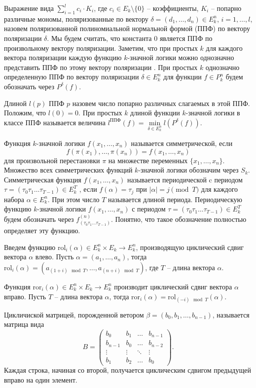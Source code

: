 \documentclass[bibliography=totoc, a4paper, 14pt]{extarticle}
\newcommand{\rol} {\textrm{rol}}
\newcommand{\ror} {\textrm{ror}}
\begin{document}
Выражение вида $\sum\limits_{i=1}^lc_i \cdot K_i$, где $c_i \in E_k\setminus\{0\}$ -- коэффициенты, $K_i$ -- попарно
различные мономы, поляризованные по вектору $\delta = (d_1, \dots, d_n) \in E_k^n$, $i = 1, \dots , l$, назовем
поляризованной полиномиальной нормальной формой (ППФ) по вектору поляризации $\delta$. Мы будем считать, что константа 0
является ППФ по произвольному вектору поляризации. Заметим, что при простых $k$ для каждого вектора поляризации каждую функцию
$k$\nobreakdash-значной логики можно однозначно представить ППФ по этому вектору поляризации \cite{ss02}. При простых $k$
однозначно определенную ППФ по вектору поляризации $\delta \in E_k^n$ для функции
$f \in P_k^n$ будем обозначать через $P^{\delta}(f)$.

Длиной $l(p)$ ППФ $p$ назовем число попарно различных слагаемых в этой
ППФ. Положим, что $l(0) = 0$. При простых $k$ длиной функции $k$\nobreakdash-значной
логики в классе ППФ называется величина $l^{\text{ППФ}}(f) = \min\limits_{\delta \in E_k^n}l(P^{\delta}(f))$.

Функция $k$\nobreakdash-значной логики $f(x_1 ,\dots , x_n)$ называется симметрической, если
$$f(\pi(x_1), \dots, \pi(x_n)) = f(x_1, \dots, x_n)$$
для произвольной перестановки $\pi$ на множестве переменных $\{x_1 , \dots , x_n \}$.
Множество всех симметрических функций $k$\nobreakdash-значной логики обозначим через $S_k$.
Симметрическая функция $f(x_1, \dots, x_n)$ называется периодической c
периодом $\tau = (\tau_0 \tau_1 \dots \tau_{T-1}) \in E_k^T$ , если $f(\alpha) = \tau_j$ при $|\alpha| = j \pmod T$
для каждого набора $\alpha \in E_k^n$. При этом число $T$ называется длиной периода. Периодическую функцию
$k$\nobreakdash-значной логики $f(x_1 , \dots , x_n)$ с периодом $\tau = (\tau_0 \tau_1 \dots \tau_{T-1}) \in E_k^T$
будем обозначать через $f^{(n)}_{(\tau_0 \tau_1 \dots \tau_{T-1})}$. Понятно, что
такое обозначение полностью определяет эту функцию.

Введем функцию $\rol_i(\alpha) \in E_k^n \times E_k \rightarrow E_k^n$, производящую циклический сдвиг вектора $\alpha$
влево. Пусть $\alpha = (a_1, \dots, a_n)$, тогда $\rol_i(\alpha) = (a_{(1+i)\mod T}, \dots, a_{(n+i)\mod T})$,
где $T$ -- длина вектора $\alpha$.

Функция $\ror_i(\alpha) \in E_k^n \times E_k \rightarrow E_k^n$ производит циклический сдвиг вектора $\alpha$
вправо. Пусть $T$ -- длина вектора $\alpha$, тогда $\ror_i(\alpha) = \rol_{(-i) \mod T}(\alpha)$.

Цикличиской матрицей, порожденной ветором $\beta = (b_0,b_1,\ldots,b_{n-1})$, называется матрица вида
$$
B = \begin{pmatrix}
b_0     & b_1    & \ldots & b_{n-1} \\
b_{n-1} & b_0    & \ldots & b_{n-2} \\
\vdots  & \vdots & \ddots & \vdots \\
b_1     & b_2    & \ldots & b_0
\end{pmatrix}
\text{.}
$$
Каждая строка, начиная со второй, получается циклическим сдвигом предыдущей вправо на один элемент.
\end{document}
